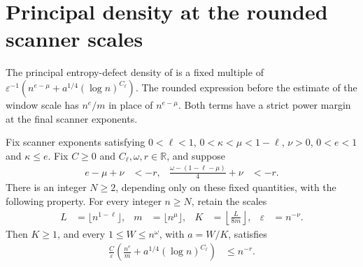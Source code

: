 \section{Principal density at the rounded scanner scales}
\label{sec:arealaw-source-density-scale}

The principal entropy-defect density of
\cite[Section~9, lines~380--384]{OpenAI2026AreaLaw} is a fixed multiple of
$\varepsilon^{-1}(n^{e-\mu}+a^{1/4}(\log n)^{C_\ell})$.
The rounded expression before the estimate of the window scale has
$n^e/m$ in place of $n^{e-\mu}$. Both terms have a strict power margin
at the final scanner exponents.

\begin{lemma}
    \label{thm:arealaw-source-density-scale}
    \leanok
    Fix scanner exponents satisfying
    $0<\ell<1$, $0<\kappa<\mu<1-\ell$, $\nu>0$,
    $0<e<1$ and $\kappa\leq e$.
    Fix $C\geq0$ and $C_\ell,\omega,r\in\mathbb R$, and suppose
    \begin{align}
        e-\mu+\nu                       & <-r, &
        \frac{\omega-(1-\ell-\mu)}4+\nu & <-r.
        \label{eq:density_scale_margins}
    \end{align}
    There is an integer $N\geq2$, depending only on these fixed
    quantities, with the following property. For every integer $n\geq N$,
    retain the scales
    \begin{align}
        L           & =\lfloor n^{1-\ell}\rfloor,             &
        m           & =\lfloor n^\mu\rfloor,                  &
        K           & =\left\lfloor\frac{L}{8m}\right\rfloor, &
        \varepsilon & =n^{-\nu}.
        \label{eq:density_scale_scales}
    \end{align}
    Then $K\geq1$, and every $1\leq W\leq n^\omega$, with $a=W/K$,
    satisfies
    \begin{align}
        \frac C\varepsilon
        \left(\frac{n^e}{m}+a^{1/4}(\log n)^{C_\ell}\right)
         & \leq n^{-r}.
        \label{eq:density_scale_bound}
    \end{align}
\end{lemma}

